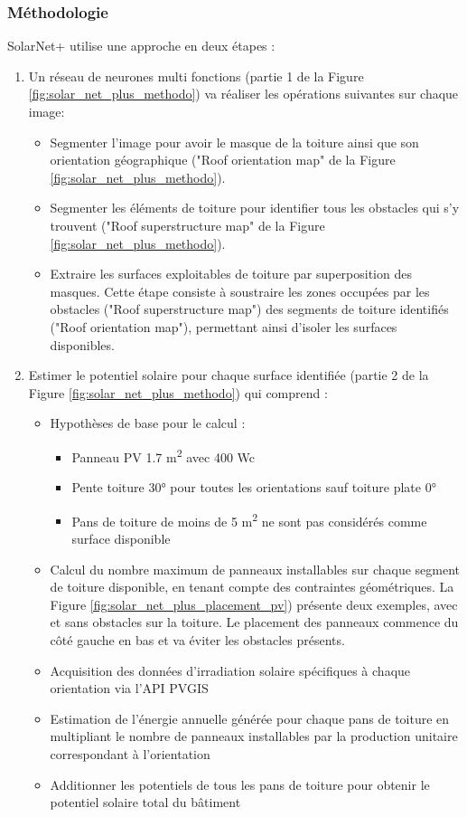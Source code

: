 {{{{\subsubsection{Méthodologie}
\par{SolarNet+ utilise une approche en deux étapes :}
\begin{enumerate}
    \item Un réseau de neurones multi fonctions (partie 1 de la Figure \ref{fig:solar_net_plus_methodo}) va réaliser les opérations suivantes sur chaque image:
    \begin{itemize}
        \item Segmenter l'image pour avoir le masque de la toiture ainsi que son orientation géographique ("Roof orientation map" de la Figure \ref{fig:solar_net_plus_methodo}).
        \item Segmenter les éléments de toiture pour identifier tous les obstacles qui s'y trouvent ("Roof superstructure map" de la Figure \ref{fig:solar_net_plus_methodo}).
        \item Extraire les surfaces exploitables de toiture par superposition des masques. Cette étape consiste à soustraire les zones occupées par les obstacles ("Roof superstructure map") des segments de toiture identifiés ("Roof orientation map"), permettant ainsi d'isoler les surfaces disponibles.
    \end{itemize}
    \item Estimer le potentiel solaire pour chaque surface identifiée (partie 2 de la Figure \ref{fig:solar_net_plus_methodo}) qui comprend :
    \begin{itemize}
        \item Hypothèses de base pour le calcul :
        \begin{itemize}
            \item Panneau PV 1.7 \si{\unit{\square\meter}} avec 400 Wc
            \item Pente toiture 30° pour toutes les orientations sauf toiture plate 0°
            \item Pans de toiture de moins de 5 \si{\unit{\square\meter}} ne sont pas considérés comme surface disponible
        \end{itemize}
        \item Calcul du nombre maximum de panneaux installables sur chaque segment de toiture disponible, en tenant compte des contraintes géométriques. La Figure \ref{fig:solar_net_plus_placement_pv}) présente deux exemples, avec et sans obstacles sur la toiture. Le placement des panneaux commence du côté gauche en bas et va éviter les obstacles présents.
        \item Acquisition des données d'irradiation solaire spécifiques à chaque orientation via l'API PVGIS
        \item Estimation de l'énergie annuelle générée pour chaque pans de toiture en multipliant le nombre de panneaux installables par la production unitaire correspondant à l'orientation
        \item Additionner les potentiels de tous les pans de toiture pour obtenir le potentiel solaire total du bâtiment
    \end{itemize}
\end{enumerate}

}}}}

